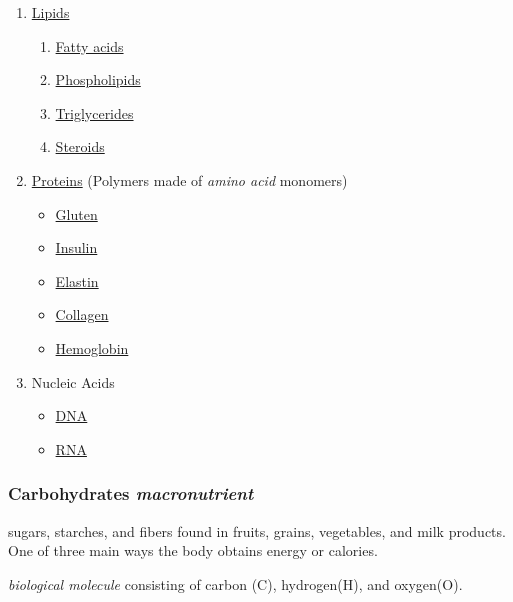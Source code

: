 \documentclass[11pt]{article}
\begin{document}
\begin{enumerate}
\item \hyperref[sec:orged5276d]{Lipids}
\begin{enumerate}
\item \hyperref[sec:org9f7d610]{Fatty acids}
\item \hyperref[sec:orgb206f86]{Phospholipids}
\item \hyperref[sec:org2f5773c]{Triglycerides}
\item \hyperref[sec:org1f6dd99]{Steroids}
\end{enumerate}
\item \hyperref[sec:org01ca357]{Proteins} (Polymers made of \emph{amino acid} monomers)
\begin{itemize}
\item \hyperref[sec:orgb977ee1]{Gluten}
\item \hyperref[sec:org9d0c5b8]{Insulin}
\item \hyperref[sec:orgf2c3b90]{Elastin}
\item \hyperref[sec:org7fddd30]{Collagen}
\item \hyperref[sec:org79e368e]{Hemoglobin}
\end{itemize}

\item Nucleic Acids
\begin{itemize}
\item \hyperref[sec:org9458e10]{DNA}
\item \hyperref[sec:org55a0135]{RNA}
\end{itemize}
\end{enumerate}

\subsubsection{Carbohydrates \emph{macronutrient}}
\label{sec:orga968f94}
sugars, starches, and fibers found in fruits, grains, vegetables, and milk
products. One of three main ways the body obtains energy or calories.

\emph{biological molecule} consisting of carbon (C), hydrogen(H), and oxygen(O).
\end{document}
